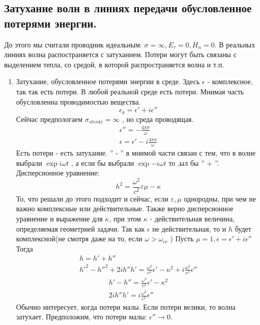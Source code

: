 \subsection{Затухание волн в линиях передачи обусловленное потерями энергии.}
До этого мы считали проводник идеальным: $\sigma = \infty, E_{\tau} = 0, H_n = 0$.
%
В реальных линиях волна распостраняется с затуханием. Потери могут быть связаны с выделением тепла, со средой, в которой распространяется волна и т.п.
%
\begin{enumerate}
	\item Затухание, обусловленное потерями энергии в среде.
	Здесь $\epsilon$ - комплексное, так так есть потери. В любой реальной среде есть потери. Мнимая часть обусловленна проводимостью вещества.
	\begin{equation}
		\epsilon_{k} = \epsilon' + i \epsilon''
	\end{equation}
	Сейчас предпологаем $\sigma_{stenki} = \infty$ , но среда проводящая.
	\begin{gather}
		\epsilon'' = - \frac{4 \pi \sigma}{\omega}\\
		\epsilon = \epsilon' - i \frac{4 \pi \sigma}{\omega}
	\end{gather}
	Есть потери - есть затухание. '' - '' в мнимой части связан с тем, что в волне выбрали $\exp{ i \omega t}$ , а если бы выбрали $\exp{- i \omega t}$ то ,ыл бы '' + ''.
	Дисперсионное уравнение:
	\begin{equation}
		h^2= \frac{\omega^2}{c^2}{\varepsilon \mu} -\kappa
	\end{equation}
	То, что решали до этого подходит и сейчас, если $\varepsilon, \mu$ однородны, при чем не важно комплексные или действительные.
	Также верно дисперсионное уравнение и выражение для $\kappa$, при этом $\kappa$ - действительная величина, определяемая геометрией задачи. Так как $\epsilon$ не действительная, то и $h$   будет комплексной(не смотря даже на то, если $\omega > \omega_{cr}$ )
	Пусть $\mu = 1, \epsilon = \epsilon' + i \epsilon''$
	Тогда 
	\begin{gather}
		h = h' + h''\\
		h'^2 - h''^2 + 2 i h'' h' = \frac{\omega^2}{c^2} \epsilon' - \kappa^2 + i \frac{\omega^2}{c^2} \epsilon''
	\end{gather}
	\begin{gather}
		h' - h'' = \frac{\omega^2}{c^2} \epsilon' - \kappa^2\\
		2 i h'' h' = i \frac{\omega^2}{c^2} \epsilon''
	\end{gather}
	Обычно интересует, когда потери малы. Если потери велики, то волна затухает.
	Предположим, что потери малы: $\epsilon''  \rightarrow 0 $.
	

\end{enumerate}
